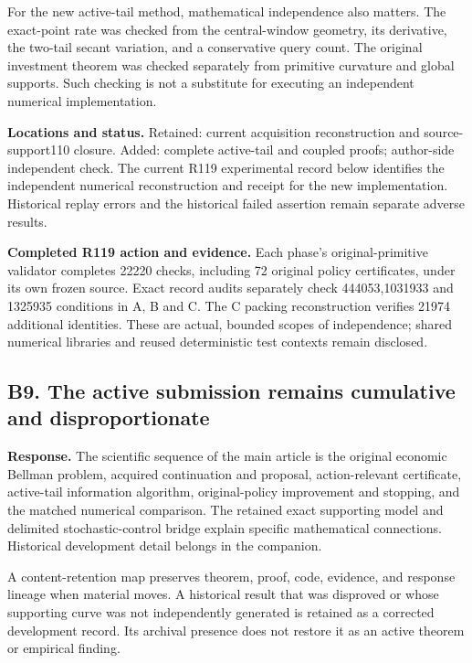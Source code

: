 For the new active-tail method, mathematical independence also matters. The exact-point rate was checked from the central-window geometry, its derivative, the two-tail secant variation, and a conservative query count. The original investment theorem was checked separately from primitive curvature and global supports. Such checking is not a substitute for executing an independent numerical implementation.

\textbf{Locations and status.} Retained: current acquisition reconstruction and source-support110 closure. Added: complete active-tail and coupled proofs; author-side independent check. The current R119 experimental record below identifies the independent numerical reconstruction and receipt for the new implementation. Historical replay errors and the historical failed assertion remain separate adverse results.

\textbf{Completed R119 action and evidence.} Each phase's original-primitive validator completes 22220 checks, including 72 original policy certificates, under its own frozen source. Exact record audits separately check 444053,1031933 and 1325935 conditions in A, B and C. The C packing reconstruction verifies 21974 additional identities. These are actual, bounded scopes of independence; shared numerical libraries and reused deterministic test contexts remain disclosed.

\hypertarget{b9.-the-active-submission-remains-cumulative-and-disproportionate}{%
\subsection{B9. The active submission remains cumulative and disproportionate}\label{b9.-the-active-submission-remains-cumulative-and-disproportionate}}

\textbf{Response.} The scientific sequence of the main article is the original economic Bellman problem, acquired continuation and proposal, action-relevant certificate, active-tail information algorithm, original-policy improvement and stopping, and the matched numerical comparison. The retained exact supporting model and delimited stochastic-control bridge explain specific mathematical connections. Historical development detail belongs in the companion.

A content-retention map preserves theorem, proof, code, evidence, and response lineage when material moves. A historical result that was disproved or whose supporting curve was not independently generated is retained as a corrected development record. Its archival presence does not restore it as an active theorem or empirical finding.

